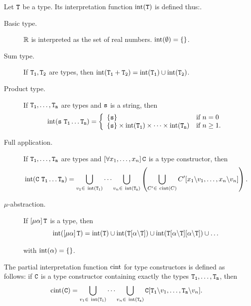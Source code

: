 \begin{definition}\label{def:typeSem}
Let $\mathtt{T}$ be a type. Its interpretation function $\operatorname{int}(\mathtt{T})$ is defined thus:.
	\begin{description}
		\item[Basic type.] $\mathbb{R}$ is interpreted as the set of real numbers. $\operatorname{int}(\emptyset) = \{\}$.
		\item[Sum type.] If $\mathtt{T_1}, \mathtt{T_2}$ are types, then $\operatorname{int}(\mathtt{T_1 + T_2}) = \operatorname{int}(\mathtt{T_1}) \cup \operatorname{int}(\mathtt{T_2})$.
		\item[Product type.] If $\mathtt{T_1},\dots,\mathtt{T_n}$ are types and $\mathtt{s}$ is a string, then
		$$
			\operatorname{int}(\mathtt{s}\ \mathtt{T_1} \dots \mathtt{T_n}) = \left\{
				\begin{array}{l l}
					\{\mathtt{s}\} & \textnormal{if } n = 0\\
					\{\mathtt{s}\} \times \operatorname{int}(\mathtt{T_1}) \times \dots \times \operatorname{int}(\mathtt{T_n}) & \textnormal{if } n \geq 1.
				\end{array}
			\right.
		$$
		
		\item[Full application.] If $\mathtt{T_1},\dots,\mathtt{T_n}$ are types and $\left[\forall x_1,\dots,x_n \right] \mathtt{C}$ is a type constructor, then
		$$
			\operatorname{int}(\mathtt{C}\ \mathtt{T_1} \dots \mathtt{T_n}) = \bigcup\limits_{v_1 \in\ \operatorname{int}(\mathtt{T_1})} \cdots \bigcup\limits_{v_n \in\ \operatorname{int}(\mathtt{T_n})} \left( \bigcup\limits_{C' \in\ \operatorname{cint}(C)} C'[x_1\backslash v_1,\dots, x_n\backslash v_n] \right).
		$$
		
		\item[$\mu$-abstraction.] If $\left[\mu \alpha \right]\mathtt{T}$ is a type, then $$\operatorname{int}(\left[\mu \alpha \right]\mathtt{T}) = \operatorname{int}(\mathtt{T}) \cup \operatorname{int}(\mathtt{T}[\alpha\backslash\mathtt{T}]) \cup \operatorname{int}(\mathtt{T}[\alpha\backslash\mathtt{T}][\alpha\backslash\mathtt{T}]) \cup \dots$$
		
		with $\operatorname{int}(\alpha) = \{\}$.
	\end{description}
\end{definition}

\begin{definition}\label{def:typeConSem}
The partial interpretation function $\operatorname{cint}$ for type constructors is defined as follows: if $\mathtt{C}$ is a type constructor containing exactly the types $\mathtt{T_1},\dots,\mathtt{T_n}$, then
	$$
		\cint(\type{C}) = \bigcup\limits_{v_1 \in\ \tint(\type{T_1})} \cdots \bigcup\limits_{v_n \in\ \tint(\type{T_n})} \type{C}[\type{T_1}\backslash v_1,\dots,\type{T_n}\backslash v_n].
	$$
\end{definition}


